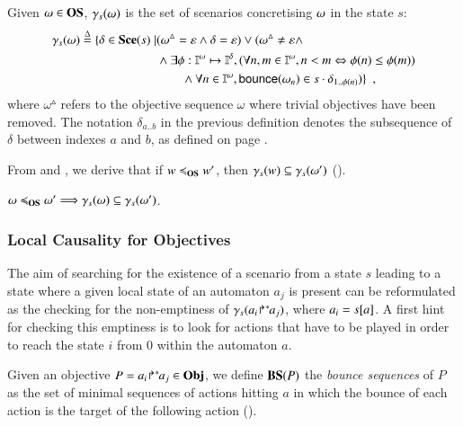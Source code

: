 
\begin{definition}[$\concr: \OS \to \powerset(\Sce)$]\label{def:concr}
Given $\omega\in\mathbf{OS}$, $\gamma_s(\omega)$ is the set of scenarios concretising $\omega$ in the
state $s$:
\begin{align*}
\gamma_s(\omega) \stackrel{\Delta}= \{ \delta\in\mathbf{Sce}(s)\mid & (\omega^\vartriangle=\varepsilon \wedge
\delta=\varepsilon)  \vee (
\omega^\vartriangle\neq \varepsilon\wedge
\\ &
 \wedge \exists \phi:\mathbb{I}^{\omega}\mapsto\mathbb{I}^{\delta},
    (\forall n,m\in\mathbb{I}^{\omega}, n<m \Leftrightarrow \phi(n)\leq\phi(m))
\\ & \qquad
	\wedge \forall n\in\mathbb{I}^{\omega},
	  \mathsf{bounce}(\omega_n) \in s\cdot\delta_{1..\phi(n)})
\}
\enspace,
\end{align*}
where $\omega^\vartriangle$ refers to the objective sequence $\omega$ where
trivial objectives have been removed.
The notation $\delta_{a..b}$ in the previous definition
denotes the subsequence of $\delta$ between indexes $a$ and $b$,
as defined on page \pageref{notations}.
\end{definition}

From  and , we derive that if 
$w\preccurlyeq_{\mathbf{OS}} w'$, then $\gamma_s(w)\subseteq\gamma_s(\omega')$ ().
\begin{lemma}\label{lem:ltw}
$\omega\preccurlyeq_{\mathbf{OS}}\omega' \Longrightarrow \gamma_s(\omega)\subseteq\gamma_s(\omega')$\enspace.
\end{lemma}


\subsubsection{Local Causality for Objectives}

The aim of searching for the existence of a scenario from a state $s$ leading to a state
where a given local state of an automaton $a_j$ is present
can be reformulated as the checking for the non-emptiness of $\gamma_s({a_i\!\Rsh^*\!\!a_j})$, where
$a_i=s[{a}]$.
A first hint for checking this emptiness is to look for actions that have to be played in order to
reach the state $i$ from $0$ within the automaton $a$.

Given an objective $P = {a_i\!\Rsh^*\!\!a_j} \in\mathbf{Obj}$, we define $\mathbf{BS}(P)$ the \emph{bounce sequences} of
$P$ as the set of minimal sequences of actions hitting $a$ in which the bounce of each action is
the target of the following action ().

